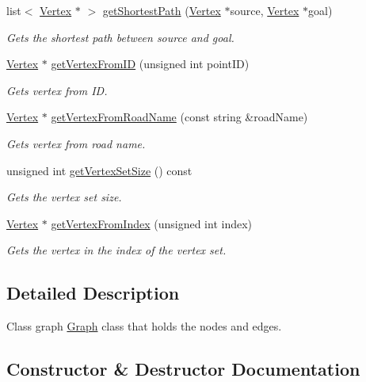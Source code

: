 \begin{DoxyCompactItemize}
list$<$ \hyperlink{class_vertex}{Vertex} $\ast$ $>$ \hyperlink{class_graph_a856f74decc1d00f6454cdfead6980f75}{get\+Shortest\+Path} (\hyperlink{class_vertex}{Vertex} $\ast$source, \hyperlink{class_vertex}{Vertex} $\ast$goal)
\begin{DoxyCompactList}\small\item\em Gets the shortest path between source and goal. \end{DoxyCompactList}\item 
\hyperlink{class_vertex}{Vertex} $\ast$ \hyperlink{class_graph_abeaeffa08d30d195ac640cd5b694c908}{get\+Vertex\+From\+ID} (unsigned int point\+ID)
\begin{DoxyCompactList}\small\item\em Gets vertex from ID. \end{DoxyCompactList}\item 
\hyperlink{class_vertex}{Vertex} $\ast$ \hyperlink{class_graph_a43795178d34bdc42663aa360e0e89750}{get\+Vertex\+From\+Road\+Name} (const string \&road\+Name)
\begin{DoxyCompactList}\small\item\em Gets vertex from road name. \end{DoxyCompactList}\item 
unsigned int \hyperlink{class_graph_aab5c890d1cbbe3286a2e3f3bf722afb6}{get\+Vertex\+Set\+Size} () const 
\begin{DoxyCompactList}\small\item\em Gets the vertex set size. \end{DoxyCompactList}\item 
\hyperlink{class_vertex}{Vertex} $\ast$ \hyperlink{class_graph_a1e365eb376b956218c3a9b5b042a7c41}{get\+Vertex\+From\+Index} (unsigned int index)
\begin{DoxyCompactList}\small\item\em Gets the vertex in the index of the vertex set. \end{DoxyCompactList}\end{DoxyCompactItemize}


\subsection{Detailed Description}
Class graph \hyperlink{class_graph}{Graph} class that holds the nodes and edges. 

\subsection{Constructor \& Destructor Documentation}
